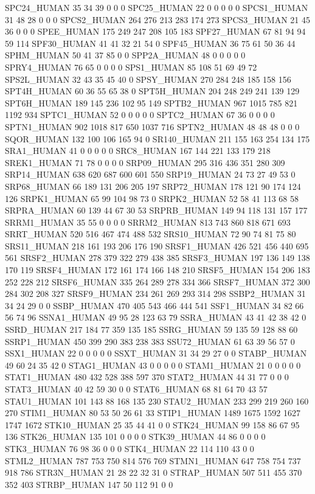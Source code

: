 SPC24_HUMAN	35	34	39	0	0	0
SPC25_HUMAN	22	0	0	0	0	0
SPCS1_HUMAN	31	48	28	0	0	0
SPCS2_HUMAN	264	276	213	283	174	273
SPCS3_HUMAN	21	45	36	0	0	0
SPEE_HUMAN	175	249	247	208	105	183
SPF27_HUMAN	67	81	94	94	59	114
SPF30_HUMAN	41	41	32	21	54	0
SPF45_HUMAN	36	75	61	50	36	44
SPHM_HUMAN	50	41	37	85	0	0
SPP2A_HUMAN	48	0	0	0	0	0
SPRY4_HUMAN	76	65	0	0	0	0
SPS1_HUMAN	85	108	51	69	49	72
SPS2L_HUMAN	32	43	35	45	40	0
SPSY_HUMAN	270	284	248	185	158	156
SPT4H_HUMAN	60	36	55	65	38	0
SPT5H_HUMAN	204	248	249	241	139	129
SPT6H_HUMAN	189	145	236	102	95	149
SPTB2_HUMAN	967	1015	785	821	1192	934
SPTC1_HUMAN	52	0	0	0	0	0
SPTC2_HUMAN	67	36	0	0	0	0
SPTN1_HUMAN	902	1018	817	650	1037	716
SPTN2_HUMAN	48	48	48	0	0	0
SQOR_HUMAN	132	100	106	165	94	0
SR140_HUMAN	211	155	163	254	134	175
SRA1_HUMAN	41	0	0	0	0	0
SRC8_HUMAN	167	144	221	133	179	218
SREK1_HUMAN	71	78	0	0	0	0
SRP09_HUMAN	295	316	436	351	280	309
SRP14_HUMAN	638	620	687	600	601	550
SRP19_HUMAN	24	73	27	49	53	0
SRP68_HUMAN	66	189	131	206	205	197
SRP72_HUMAN	178	121	90	174	124	126
SRPK1_HUMAN	65	99	104	98	73	0
SRPK2_HUMAN	52	58	41	113	68	58
SRPRA_HUMAN	60	139	44	67	30	53
SRPRB_HUMAN	149	94	118	131	157	177
SRRM1_HUMAN	35	55	0	0	0	0
SRRM2_HUMAN	813	743	860	818	671	693
SRRT_HUMAN	520	516	467	474	488	532
SRS10_HUMAN	72	90	74	81	75	80
SRS11_HUMAN	218	161	193	206	176	190
SRSF1_HUMAN	426	521	456	440	695	561
SRSF2_HUMAN	278	379	322	279	438	385
SRSF3_HUMAN	197	136	149	138	170	119
SRSF4_HUMAN	172	161	174	166	148	210
SRSF5_HUMAN	154	206	183	252	228	212
SRSF6_HUMAN	335	264	289	278	334	366
SRSF7_HUMAN	372	300	284	302	208	327
SRSF9_HUMAN	234	261	269	293	314	298
SSBP2_HUMAN	31	34	24	29	0	0
SSBP_HUMAN	470	405	543	466	444	541
SSF1_HUMAN	34	82	66	56	74	96
SSNA1_HUMAN	49	95	28	123	63	79
SSRA_HUMAN	43	41	42	38	42	0
SSRD_HUMAN	217	184	77	359	135	185
SSRG_HUMAN	59	135	59	128	88	60
SSRP1_HUMAN	450	399	290	383	238	383
SSU72_HUMAN	61	63	39	56	57	0
SSX1_HUMAN	22	0	0	0	0	0
SSXT_HUMAN	31	34	29	27	0	0
STABP_HUMAN	49	60	24	35	42	0
STAG1_HUMAN	43	0	0	0	0	0
STAM1_HUMAN	21	0	0	0	0	0
STAT1_HUMAN	480	432	528	388	597	370
STAT2_HUMAN	44	31	77	0	0	0
STAT3_HUMAN	40	42	59	30	0	0
STAT6_HUMAN	68	81	64	70	43	57
STAU1_HUMAN	101	143	88	168	135	230
STAU2_HUMAN	233	299	219	260	160	270
STIM1_HUMAN	80	53	50	26	61	33
STIP1_HUMAN	1489	1675	1592	1627	1747	1672
STK10_HUMAN	25	35	44	41	0	0
STK24_HUMAN	99	158	86	67	95	136
STK26_HUMAN	135	101	0	0	0	0
STK39_HUMAN	44	86	0	0	0	0
STK3_HUMAN	76	98	36	0	0	0
STK4_HUMAN	22	114	110	43	0	0
STML2_HUMAN	787	753	750	814	576	769
STMN1_HUMAN	647	758	754	737	918	786
STR3N_HUMAN	21	28	22	32	31	0
STRAP_HUMAN	507	511	455	370	352	403
STRBP_HUMAN	147	50	112	91	0	0
